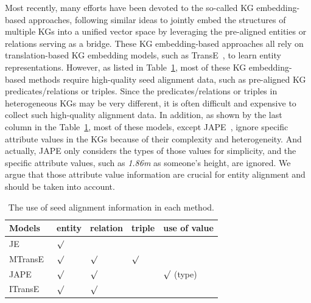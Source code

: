 	Most recently, many efforts have been devoted to the so-called KG embedding-based approaches, following similar ideas to jointly embed the structures of multiple KGs into a unified vector space by leveraging the pre-aligned entities or relations serving as a bridge. These KG embedding-based approaches all rely on translation-based KG embedding models, such as TransE~\cite{bordes2013translating}, to learn entity representations. However, as listed in Table~\ref{seed}, most of these KG embedding-based methods require high-quality seed alignment data, such as pre-aligned KG predicates/relations or triples. Since the predicates/relations or triples in heterogeneous KGs may be very different, it is often difficult and expensive to collect such high-quality alignment data. In addition, as shown by the last column in the Table~\ref{seed}, most of these models, except JAPE~\cite{sun2017cross}, ignore specific attribute values in the KGs because of their complexity and heterogeneity. And actually, JAPE only considers the types of those values for simplicity, and the specific attribute values, such as \textit{1.86m} as someone's height, are ignored. We argue that those attribute value information are crucial for entity alignment and should be taken into account.
	\begin{table}
		\centering
		\scriptsize
		\begin{tabular}{lllll}
			\toprule
			\bf Models & \bf entity & \bf relation & \bf triple & \bf use of value \\
			\midrule
			JE~\cite{hao2016joint} & ${\surd}$ & & & \\
			MTransE~\cite{chen2016multilingual} & ${\surd}$ & ${\surd}$ & ${\surd}$ & \\
			JAPE~\cite{sun2017cross} & ${\surd}$& ${\surd}$& & ${\surd}$ (type)\\
			ITransE~\cite{zhu2017iterative} & ${\surd}$ & ${\surd}$& & \\
			\bottomrule
		\end{tabular}
		\caption{The use of seed alignment information in each method.}
		\label{seed}
	\end{table}
	
